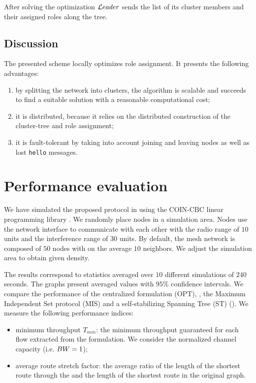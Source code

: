 \documentclass[twoside]{article}
\begin{document}
After solving the \milp optimization $\mathcal{L}eader$ sends the list of its
cluster members and their assigned roles along the tree.

\subsection{Discussion}

The presented scheme locally optimizes role assignment. It presents the following advantages:
\begin{enumerate}
\item by splitting the network into clusters, the algorithm is
  scalable and succeeds to find a suitable solution with a reasonable
  computational cost;
\item it is distributed, because it relies on the distributed
  construction of the cluster-tree and role assignment;
\item it is fault-tolerant by taking into account joining and leaving
  nodes as well as lost \texttt{hello} messages.
\end{enumerate}



\section{Performance evaluation}
\label{section:performance_evaluation}

We have simulated the proposed protocol in \wsnet\cite{wsnet} using
the COIN-CBC linear programming library \cite{coin-cbc}. We randomly
place nodes in a simulation area. Nodes use the  network
interface to communicate with each other with the radio range of $10$
units and the interference range of $30$ units. By default, the mesh
network is composed of $50$ nodes with on the average $10$ neighbors. We
adjust the simulation area to obtain given density.

The results correspond to statistics averaged over $10$ different
simulations of $240$ seconds. The graphs present averaged values with
$95\%$ confidence intervals. We compare the performance of the
centralized \milp formulation (OPT), \potatoes, the Maximum
Independent Set protocol (MIS) and a self-stabilizing Spanning Tree
(ST) (\cite{molecular_milp09rr}). We measure the following performance
indices:
\begin{itemize}
\item minimum throughput $T_{min}$: the minimum throughput guaranteed
  for each flow extracted from the \milp formulation. We consider the
  normalized channel capacity (i.e. $BW = 1$);
\item average route stretch factor: the average ratio of the length of
  the shortest route through the \rwcds and the length of the
  shortest route in the original graph.
\end{itemize}
\end{document}

